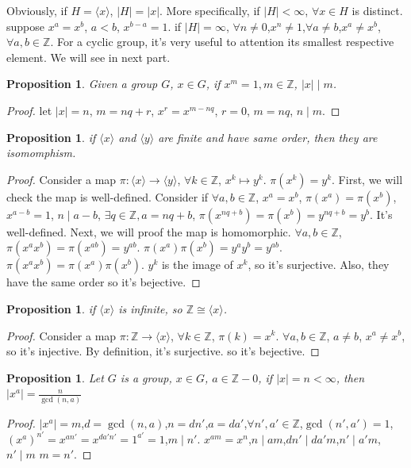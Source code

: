 \documentclass[10pt,a4paper]{article}
\newtheorem{proposition}[theorem]{Proposition}
\theoremstyle{definition}
\begin{document}
Obviously, if $H=\langle x\rangle$, $|H|=|x|$. More specifically, if $|H|<\infty$, $\forall x\in H$ is distinct. suppose $x^a=x^b$, $a<b$,
$x^{b-a}=1$. if $|H|=\infty$, $\forall n\ne0$,$x^n\ne1$,$\forall a\ne b$,$x^a\ne x^b$,$\forall a,b\in\mathbb{Z}$. For a cyclic group, it's very useful to attention its smallest respective element. We will see in next part.
\begin{proposition}
    Given a group $G$, $x\in G$, if $x^m=1,m\in\mathbb{Z}$, $|x|\mid m$. 
\end{proposition}
\begin{proof}
    let $|x|=n$, $m=nq+r$, $x^r=x^{m-nq}$, $r=0$, $m=nq$, $n\mid m$.
\end{proof}
\begin{proposition}
    if $\langle x\rangle$ and $\langle y\rangle$ are finite and have same order, then they are isomomphism.
\end{proposition}
\begin{proof}
    Consider a map $\pi:\langle x\rangle\to\langle y\rangle$, $\forall k\in\mathbb{Z}$, $x^k\mapsto y^k$. $\pi(x^k)=y^k$. First, we will check the map is well-defined.
    Consider if $\forall a,b\in\mathbb{Z}$, $x^a=x^b$, $\pi(x^a)=\pi(x^b)$, $x^{a-b}=1$, $n\mid a-b$, $\exists q\in\mathbb{Z},a=nq+b$, $\pi(x^{nq+b})=\pi(x^b)=y^{nq+b}=y^b$. It's well-defined.
    Next, we will proof the map is homomorphic. $\forall a,b\in\mathbb{Z}$, $\pi(x^ax^b)=\pi(x^{ab})=y^{ab}$. $\pi(x^a)\pi(x^b)=y^ay^b=y^{ab}$. $\pi(x^ax^b)=\pi(x^a)\pi(x^b)$. $y^k$ is the image of $x^k$, so it's surjective. Also, they have the same order so it's bejective.
\end{proof}
\begin{proposition}
    if $\langle x\rangle$ is infinite, so $\mathbb{Z}\cong\langle x\rangle$.
\end{proposition}
\begin{proof}
    Consider a map $\pi:\mathbb{Z}\to\langle x\rangle$, $\forall k\in\mathbb{Z}$, $\pi(k)=x^k$. $\forall a,b\in\mathbb{Z}$, $a\ne b$, $x^a\ne x^b$, so it's injective. By definition, it's surjective. so it's bejective.
\end{proof}
\begin{proposition}
    Let $G$ is a group, $x\in G$, $a\in\mathbb{Z}-0$, if $|x|=n<\infty$, then $|x^a|=\frac{n}{\gcd(n,a)}$
\end{proposition}
\begin{proof}
    $|x^a|=m$,$d=\gcd(n,a)$,$n=dn'$,$a=da'$,$\forall n',a'\in\mathbb{Z}$,$\gcd(n',a')=1$, $(x^a)^{n'}=x^{an'}=x^{da'n'}=1^{a'}=1$,$m\mid n'$.
    $x^{am}=x^n$,$n\mid am$,$dn'\mid da'm$,$n'\mid a'm$, $n'\mid m$
    $m=n'$.
\end{proof}
\end{document}
